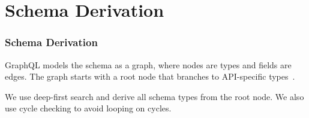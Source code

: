 
\section{Schema Derivation} 
\begin{frame}\frametitle{Schema Derivation}

GraphQL models the schema as a graph, where nodes are types and fields are edges. The graph starts with a root node that branches to API-specific types~\cite{migrating-to-gql}. 

We use deep-first search and derive all schema types from the root node. We also use cycle checking to avoid looping on cycles.

\end{frame}
